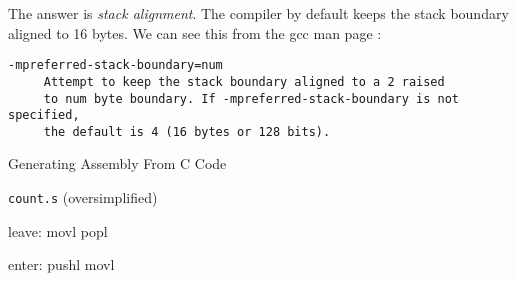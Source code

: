The answer is \emph{stack alignment}. The compiler by default keeps the stack boundary
aligned to 16 bytes. We can see this from the gcc man page :
\begin{verbatim}
-mpreferred-stack-boundary=num
     Attempt to keep the stack boundary aligned to a 2 raised
     to num byte boundary. If -mpreferred-stack-boundary is not specified,
     the default is 4 (16 bytes or 128 bits).
\end{verbatim}

\begin{frame}[fragile=singleslide]{Generating Assembly From C Code}
  \begin{minipage}{.5\linewidth}
      \begin{block}{\texttt{count.s} {\scriptsize (oversimplified)}}
        \begin{center}
        \end{center}
      \end{block}    
  \end{minipage}\quad
  \begin{minipage}{.4\linewidth}
\begin{gascode}
leave:
    movl %
    popl %

enter:
    pushl %
    movl  %
\end{gascode}
  \end{minipage}
\end{frame}


